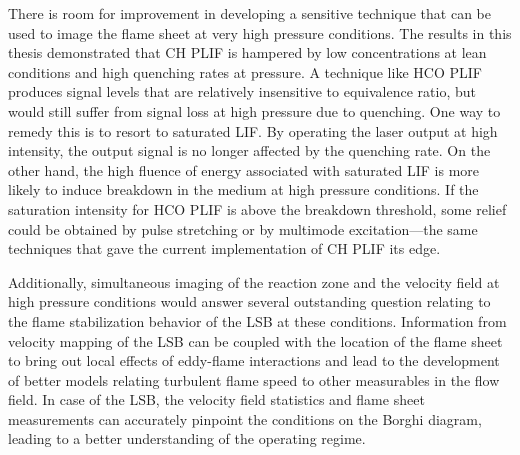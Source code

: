 There is room for improvement in developing a sensitive technique that can be used to image the flame sheet at very high pressure conditions.
The results in this thesis demonstrated that CH PLIF is hampered by low concentrations at lean conditions and high quenching rates at pressure.
A technique like HCO PLIF produces signal levels that are relatively insensitive to equivalence ratio, but would still suffer from signal loss at high pressure due to quenching.
One way to remedy this is to resort to saturated LIF.
By operating the laser output at high intensity, the output signal is no longer affected by the quenching rate.
On the other hand, the high fluence of energy associated with saturated LIF is more likely to induce breakdown in the medium at high pressure conditions.
If the saturation intensity for HCO PLIF is above the breakdown threshold, some relief could be obtained by pulse stretching or by multimode excitation---the same techniques that gave the current implementation of CH PLIF its edge.

Additionally, simultaneous imaging of the reaction zone and the velocity field at high pressure conditions would answer several outstanding question relating to the flame stabilization behavior of the LSB at these conditions.
Information from velocity mapping of the LSB can be coupled with the location of the flame sheet to bring out local effects of eddy-flame interactions and lead to the development of better models relating turbulent flame speed to other measurables in the flow field.
In case of the LSB, the velocity field statistics and flame sheet measurements can accurately pinpoint the conditions on the Borghi diagram, leading to a better understanding of the operating regime.


